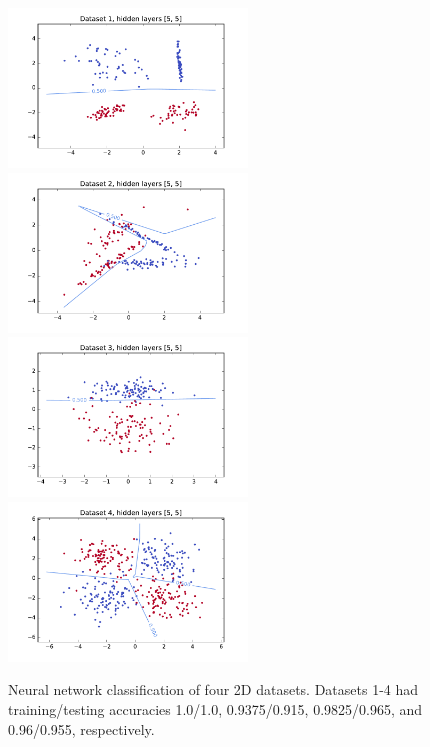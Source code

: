 \documentclass{article}
\begin{document}
\begin{multicols}{2}
\begin{figure}[h]
   \centering
   \includegraphics[width=2.5in]{img/p1/1-200of200.pdf}
   \includegraphics[width=2.5in]{img/p1/2-183of200.pdf}
   \includegraphics[width=2.5in]{img/p1/3-192of200.pdf}
   \includegraphics[width=2.5in]{img/p1/4-382of400.pdf}
   \caption{Neural network classification of four 2D datasets.
   Datasets 1-4 had training/testing accuracies 1.0/1.0, 0.9375/0.915, 0.9825/0.965, and 0.96/0.955,
   respectively.
   }
   \label{fig:1-2-classify}
\end{figure}


\end{multicols}
\end{document}
